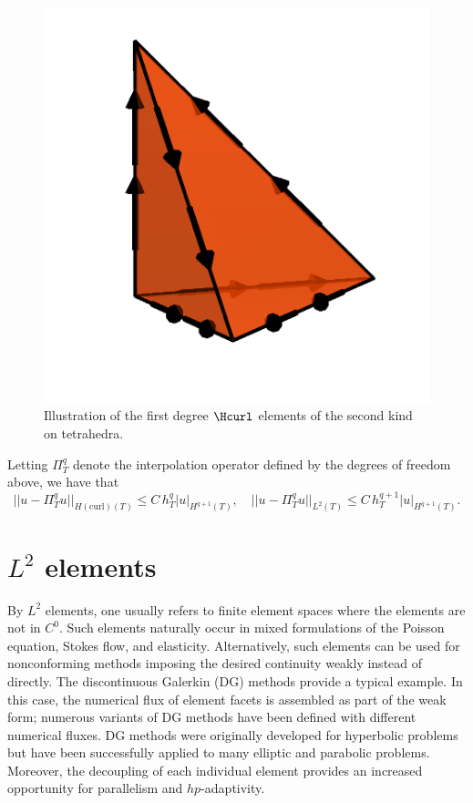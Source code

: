 \begin{figure}
  \begin{center}
    \includegraphics[width=\elmfigsizesingle]{chapters/kirby-6/png/NED2_1_3d.png}
    \caption{Illustration of the first degree \nedelec{} $\Hcurl$
      elements of the second kind on tetrahedra.}
  \end{center}
  \label{kirby-6:fig:ned2:tet}
\end{figure}

Letting $\Pi_T^q$ denote the interpolation operator defined by the
degrees of freedom above, we have that \citep[Proposition 3]{Nedelec1986}
\begin{equation}
  ||u - \Pi_T^q u||_{H(\mathrm{curl})(T)} \leqslant C \, h_T^{q} |u|_{H^{q+1}(T)}, \quad
  ||u - \Pi_T^q u||_{L^2(T)} \leqslant C \, h_T^{q+1} |u|_{H^{q+1}(T)}.
\end{equation}

\section{$L^2$ elements}

By $L^2$ elements, one usually refers to finite element spaces where
the elements are not in $C^0$. Such elements naturally occur in mixed
formulations of the Poisson equation, Stokes flow, and
elasticity. Alternatively, such elements can be used for nonconforming
methods imposing the desired continuity weakly instead of
directly. The discontinuous Galerkin (DG) methods provide a typical
example. In this case, the numerical flux of element facets is
assembled as part of the weak form; numerous variants of DG methods
have been defined with different numerical fluxes. DG methods were
originally developed for hyperbolic problems but have been
successfully applied to many elliptic and parabolic
problems. Moreover, the decoupling of each individual element provides
an increased opportunity for parallelism and $hp$-adaptivity.

